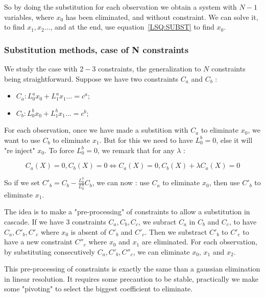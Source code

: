 So by doing the substitution for each observation we obtain a system with $N-1$ variables,
where $x_0$ has been eliminated, and without constraint. We can solve it, to find $x_1, x_2 \dots $,
and at the end, use equation~\ref{LSQ:SUBST} to find $x_0$.



\subsubsection{Substitution methods, case of N constraints}
\label{CSTR:NSUBST}

We study the case with $2-3$ constraints, the generalization to $N$ constraints being straightforward.
Suppose we have two constraints $C_a$ and $C_b$ :

\begin{itemize}
    \item $C_a : L^a_0 x_0 +  L^a_1 x_1 \dots    = c^a$;
    \item $C_b : L^b_0 x_0 +  L^b_1 x_1 \dots    = c^b$;
\end{itemize}

For each observation, once we have made a substition with $C_a$ to eliminate $x_0$,
 we  want to use $C_b$ to eliminate $x_1$.
But for this we need to have $ L^b_0=0$, else it will "re inject" $x_0$.  To
force $L^b_0=0$, we remark  that for any $\lambda$ :

\begin{equation}
    C_a(X)=0  , C_b(X)=0   \Leftrightarrow  C_a(X)=0  , C_b(X)+\lambda C_a(X) =0
\end{equation}

So if we set $C'_b = C_b - \frac{L^b_0}{L^a_0} C_b$, we can now : use $C_a$ to eliminate $x_0$,
then use $C'_b$ to eliminate $x_1$. 

The idea is to make a "pre-processing" of constraints to allow a substitution in cascade.
If we have $3$ constraints $C_a, C_b, C_c$, we subract $C_a$ in $C_b$ and $C_c$, to have $C_a, C'_b, C'_c$
where $x_0$ is absent of $C'_b$ and $C'_c$. Then we substract  $C'_b$ to $C'_c$ to have a new constraint 
$C''_c$ where  $x_0$ and $x_1$ are eliminated.  For each observation, by substituting consecutively $C_a,C'_b,C''_c$, we can eliminate
$x_0$, $x_1$ and $x_2$.

This pre-processing of constraints is exactly the same than a gaussian elimination in linear resolution.
It requires some precaution to be stable, practically we make some "pivoting" to select the biggest coefficient
to eliminate.

